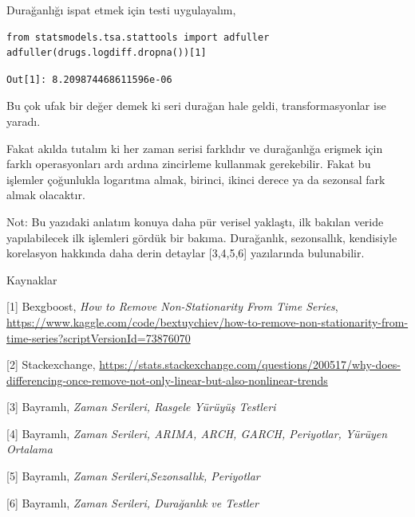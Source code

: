 \documentclass[12pt,fleqn]{article}\usepackage{../../common}
\begin{document}
Durağanlığı ispat etmek için testi uygulayalım,

\begin{verbatim}
from statsmodels.tsa.stattools import adfuller
adfuller(drugs.logdiff.dropna())[1]
\end{verbatim}

\begin{verbatim}
Out[1]: 8.209874468611596e-06
\end{verbatim}

Bu çok ufak bir değer demek ki seri durağan hale geldi, transformasyonlar
ise yaradı.

Fakat akılda tutalım ki her zaman serisi farklıdır ve durağanlığa erişmek için
farklı operasyonları ardı ardına zincirleme kullanmak gerekebilir.  Fakat bu
işlemler çoğunlukla logarıtma almak, birinci, ikinci derece ya da sezonsal fark
almak olacaktır.

Not: Bu yazıdaki anlatım konuya daha pür verisel yaklaştı, ilk bakılan veride
yapılabilecek ilk işlemleri gördük bir bakıma. Durağanlık, sezonsallık,
kendisiyle korelasyon hakkında daha derin detaylar [3,4,5,6] yazılarında
bulunabilir.

Kaynaklar

[1] Bexgboost, {\em How to Remove Non-Stationarity From Time Series},
    \url{https://www.kaggle.com/code/bextuychiev/how-to-remove-non-stationarity-from-time-series?scriptVersionId=73876070}

[2] Stackexchange,
    \url{https://stats.stackexchange.com/questions/200517/why-does-differencing-once-remove-not-only-linear-but-also-nonlinear-trends}

[3] Bayramlı, {\em Zaman Serileri, Rasgele Yürüyüş Testleri}

[4] Bayramlı, {\em Zaman Serileri, ARIMA, ARCH, GARCH, Periyotlar, Yürüyen Ortalama}

[5] Bayramlı, {\em Zaman Serileri,Sezonsallık, Periyotlar}

[6] Bayramlı, {\em Zaman Serileri, Durağanlık ve Testler}
\end{document}
